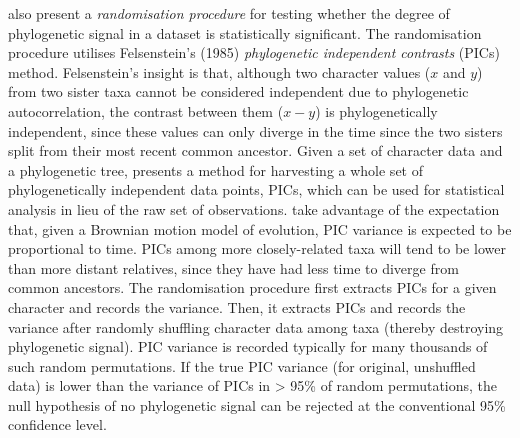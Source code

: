 \textcite{blomberg_testing_2003} also present a \emph{randomisation procedure} for testing whether the degree of phylogenetic signal in a dataset is statistically significant. The randomisation procedure utilises Felsenstein's (1985) \emph{phylogenetic independent contrasts} (PICs) method. Felsenstein's insight is that, although two character values (\(x\) and \(y\)) from two sister taxa cannot be considered independent due to phylogenetic autocorrelation, the contrast between them (\(x - y\)) is phylogenetically independent, since these values can only diverge in the time since the two sisters split from their most recent common ancestor. Given a set of character data and a phylogenetic tree, \textcite{felsenstein_phylogenies_1985} presents a method for harvesting a whole set of phylogenetically independent data points, PICs, which can be used for statistical analysis in lieu of the raw set of observations. \textcite{blomberg_testing_2003} take advantage of the expectation that, given a Brownian motion model of evolution, PIC variance is expected to be proportional to time. PICs among more closely-related taxa will tend to be lower than more distant relatives, since they have had less time to diverge from common ancestors. The randomisation procedure first extracts PICs for a given character and records the variance. Then, it extracts PICs and records the variance after randomly shuffling character data among taxa (thereby destroying phylogenetic signal). PIC variance is recorded typically for many thousands of such random permutations. If the true PIC variance (for original, unshuffled data) is lower than the variance of PICs in \textgreater{} 95\% of random permutations, the null hypothesis of no phylogenetic signal can be rejected at the conventional 95\% confidence level.

